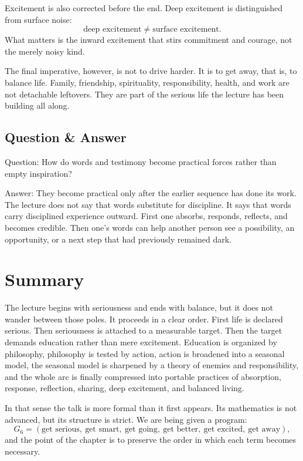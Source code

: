 Excitement is also corrected before the end. Deep excitement is distinguished from surface noise:
\begin{equation}
\text{deep excitement} \neq \text{surface excitement}.
\end{equation}
What matters is the inward excitement that stirs commitment and courage, not the merely noisy kind.

The final imperative, however, is not to drive harder. It is to get away, that is, to balance life. Family, friendship, spirituality, responsibility, health, and work are not detachable leftovers. They are part of the serious life the lecture has been building all along.

\subsection{Question \& Answer}

Question: How do words and testimony become practical forces rather than empty inspiration?

Answer: They become practical only after the earlier sequence has done its work. The lecture does not say that words substitute for discipline. It says that words carry disciplined experience outward. First one absorbs, responds, reflects, and becomes credible. Then one's words can help another person see a possibility, an opportunity, or a next step that had previously remained dark.

\section{Summary}

The lecture begins with seriousness and ends with balance, but it does not wander between those poles. It proceeds in a clear order. First life is declared serious. Then seriousness is attached to a measurable target. Then the target demands education rather than mere excitement. Education is organized by philosophy, philosophy is tested by action, action is broadened into a seasonal model, the seasonal model is sharpened by a theory of enemies and responsibility, and the whole arc is finally compressed into portable practices of absorption, response, reflection, sharing, deep excitement, and balanced living.

In that sense the talk is more formal than it first appears. Its mathematics is not advanced, but its structure is strict. We are being given a program:
\begin{equation}
G_6 = (\text{get serious},\ \text{get smart},\ \text{get going},\ \text{get better},\ \text{get excited},\ \text{get away}),
\end{equation}
and the point of the chapter is to preserve the order in which each term becomes necessary.